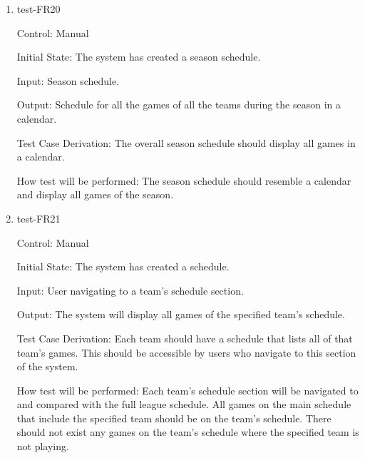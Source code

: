 \documentclass[12pt, titlepage]{article}
\begin{document}
\begin{enumerate}
  \item{test-FR20\\}

  Control: Manual

  Initial State: The system has created a season schedule.

  Input: Season schedule.

  Output: Schedule for all the games of all the teams during the season in a calendar. 

  Test Case Derivation: The overall season schedule should display all games in a calendar.

  How test will be performed: The season schedule should resemble a calendar and display all games of the season.

  \item{test-FR21\\}

  Control: Manual

  Initial State: The system has created a schedule.

  Input: User navigating to a team's schedule section.

  Output: The system will display all games of the specified team's schedule.

  Test Case Derivation: Each team should have a schedule that lists all of
  that team's games. This should be accessible by users who navigate to this
  section of the system.

  How test will be performed: Each team's schedule section will be navigated to
  and compared with the full league schedule. All games on the main schedule
  that include the specified team should be on the team's schedule. There should
  not exist any games on the team's schedule where the specified team is not
  playing.








\end{enumerate}
\end{document}
